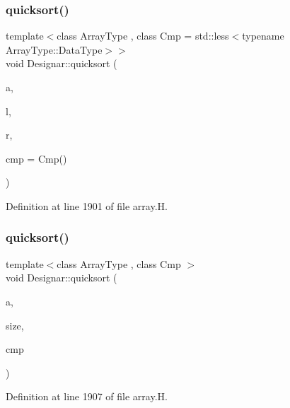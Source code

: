 \subsubsection{\texorpdfstring{quicksort()}{quicksort()}\hspace{0.1cm}{\footnotesize\ttfamily [10/14]}}
{\footnotesize\ttfamily template$<$class Array\+Type , class Cmp  = std\+::less$<$typename Array\+Type\+::\+Data\+Type$>$$>$ \\
void Designar\+::quicksort (\begin{DoxyParamCaption}\item[{Array\+Type \&}]{a,  }\item[{\hyperlink{namespace_designar_a9d113d66a39e82b73727c72cd3a52f73}{lint\+\_\+t}}]{l,  }\item[{\hyperlink{namespace_designar_a9d113d66a39e82b73727c72cd3a52f73}{lint\+\_\+t}}]{r,  }\item[{Cmp \&\&}]{cmp = {\ttfamily Cmp()} }\end{DoxyParamCaption})\hspace{0.3cm}{\ttfamily [inline]}}



Definition at line 1901 of file array.\+H.

\mbox{\label{namespace_designar_a4887d9486cdfcd7e021047915ae26651}} 
\subsubsection{\texorpdfstring{quicksort()}{quicksort()}\hspace{0.1cm}{\footnotesize\ttfamily [11/14]}}
{\footnotesize\ttfamily template$<$class Array\+Type , class Cmp $>$ \\
void Designar\+::quicksort (\begin{DoxyParamCaption}\item[{Array\+Type \&}]{a,  }\item[{\hyperlink{namespace_designar_a9d113d66a39e82b73727c72cd3a52f73}{lint\+\_\+t}}]{size,  }\item[{Cmp \&}]{cmp }\end{DoxyParamCaption})\hspace{0.3cm}{\ttfamily [inline]}}



Definition at line 1907 of file array.\+H.

